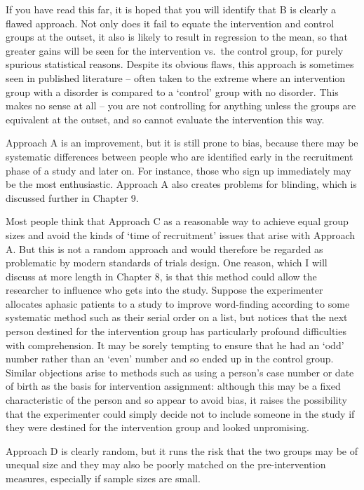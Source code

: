 \documentclass[]{book}
\begin{document}
If you have read this far, it is hoped that you will identify that B is clearly a flawed approach. Not only does it fail to equate the intervention and control groups at the outset, it also is likely to result in regression to the mean, so that greater gains will be seen for the intervention vs.~the control group, for purely spurious statistical reasons. Despite its obvious flaws, this approach is sometimes seen in published literature -- often taken to the extreme where an intervention group with a disorder is compared to a `control' group with no disorder. This makes no sense at all -- you are not controlling for anything unless the groups are equivalent at the outset, and so cannot evaluate the intervention this way.

Approach A is an improvement, but it is still prone to bias, because there may be systematic differences between people who are identified early in the recruitment phase of a study and later on. For instance, those who sign up immediately may be the most enthusiastic. Approach A also creates problems for blinding, which is discussed further in Chapter 9.

Most people think that Approach C as a reasonable way to achieve equal group sizes and avoid the kinds of `time of recruitment' issues that arise with Approach A. But this is not a random approach and would therefore be regarded as problematic by modern standards of trials design. One reason, which I will discuss at more length in Chapter 8, is that this method could allow the researcher to influence who gets into the study. Suppose the experimenter allocates aphasic patients to a study to improve word-finding according to some systematic method such as their serial order on a list, but notices that the next person destined for the intervention group has particularly profound difficulties with comprehension. It may be sorely tempting to ensure that he had an `odd' number rather than an `even' number and so ended up in the control group. Similar objections arise to methods such as using a person's case number or date of birth as the basis for intervention assignment: although this may be a fixed characteristic of the person and so appear to avoid bias, it raises the possibility that the experimenter could simply decide not to include someone in the study if they were destined for the intervention group and looked unpromising.

Approach D is clearly random, but it runs the risk that the two groups may be of unequal size and they may also be poorly matched on the pre-intervention measures, especially if sample sizes are small.
\end{document}
